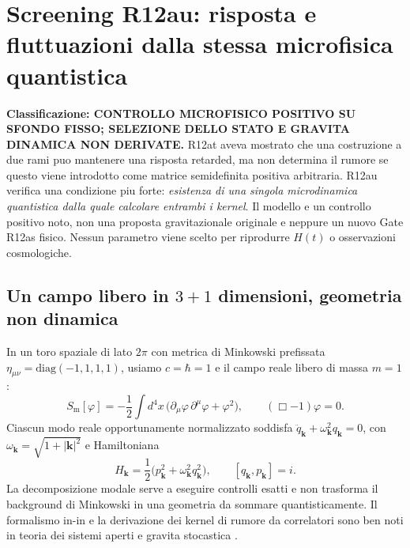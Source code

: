 \documentclass[11pt,a4paper]{article}
\newcommand{\status}[1]{\textsf{#1}}
\begin{document}
\clearpage
\section{Screening R12au: risposta e fluttuazioni dalla stessa microfisica quantistica}
\label{sec:r12au-screen}
\textbf{Classificazione: \status{CONTROLLO MICROFISICO POSITIVO SU SFONDO FISSO; SELEZIONE DELLO STATO E GRAVITA DINAMICA NON DERIVATE}.}
R12at aveva mostrato che una costruzione a due rami puo mantenere una risposta retarded, ma non determina il rumore se questo viene introdotto come matrice semidefinita positiva arbitraria. R12au verifica una condizione piu forte: \emph{esistenza di una singola microdinamica quantistica dalla quale calcolare entrambi i kernel}. Il modello e un controllo positivo noto, non una proposta gravitazionale originale e neppure un nuovo Gate R12as fisico. Nessun parametro viene scelto per riprodurre $H(t)$ o osservazioni cosmologiche.

\subsection{Un campo libero in $3+1$ dimensioni, geometria non dinamica}
In un toro spaziale di lato $2\pi$ con metrica di Minkowski prefissata $\eta_{\mu\nu}=\mathrm{diag}(-1,1,1,1)$, usiamo $c=\hbar=1$ e il campo reale libero di massa $m=1$:
\begin{equation}
 S_{\mathrm m}[\varphi]=-\frac12\int d^4x\,\bigl(\partial_\mu\varphi\,\partial^\mu\varphi+\varphi^2\bigr),
 \qquad (\Box-1)\varphi=0.
 \label{eq:r12au_field}
\end{equation}
Ciascun modo reale opportunamente normalizzato soddisfa $\ddot q_{\mathbf k}+\omega_{\mathbf k}^2q_{\mathbf k}=0$, con $\omega_{\mathbf k}=\sqrt{1+|\mathbf k|^2}$ e Hamiltoniana
\begin{equation}
 H_{\mathbf k}=\frac12\bigl(p_{\mathbf k}^2+\omega_{\mathbf k}^2q_{\mathbf k}^2\bigr),
 \qquad [q_{\mathbf k},p_{\mathbf k}]=i.
 \label{eq:r12au_ham}
\end{equation}
La decomposizione modale serve a eseguire controlli esatti e non trasforma il background di Minkowski in una geometria da sommare quantisticamente. Il formalismo in-in e la derivazione dei kernel di rumore da correlatori sono ben noti in teoria dei sistemi aperti e gravita stocastica \cite{FeynmanVernon1963,HuVerdaguer2008}.
\end{document}
